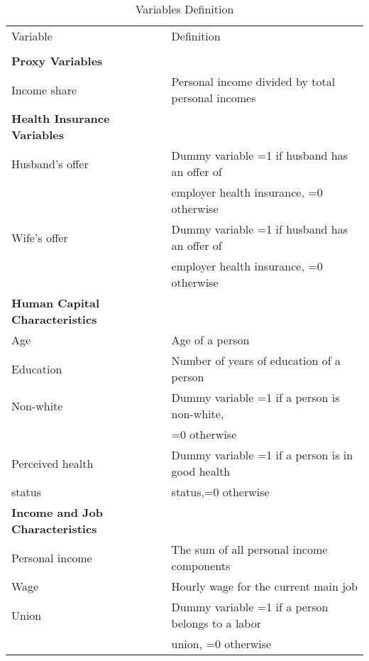 \documentclass[legno,11pt]{article}
\begin{document}
\newpage \extrarowheight=-7pt
\begin{longtable}{@{}l@{\hspace{-8pt}}l}\label{Table_1}\\[-2pt]
\caption{Variables Definition}\\[-2pt]
\toprule
Variable& Definition\\
\hline\\[-6pt]
\textbf{Proxy Variables}\\[-2pt]
\hspace{0.5cm}Income share&Personal income divided by total personal
incomes\\
\textbf{Health Insurance Variables}\\[-2pt]
\hspace{0.5cm}Husband's offer&Dummy variable =1 if husband has an
offer
of \\[-6pt]
\hspace{0.5cm}&employer health insurance, =0 otherwise \\[-2pt]
\hspace{0.5cm}Wife's offer&Dummy variable =1 if husband has an offer
of \\[-6pt]&employer health insurance, =0 otherwise \\[-6pt]
\textbf{Human Capital Characteristics}\\[-2pt]
\hspace{0.5cm}Age&Age of a person\\[-2pt]
\hspace{0.5cm}Education&Number of years of education of a person\\[-2pt]
\hspace{0.5cm}Non-white&Dummy variable =1 if a person is non-white,\\[-6pt]
& =0 otherwise\\[-2pt]
\hspace{0.5cm}Perceived health&Dummy variable =1 if a person is in good health  \\[-6pt]
\hspace{0.5cm}status &status,=0 otherwise\\[-1pt]
\textbf{Income and Job Characteristics}\\[-2pt]
\hspace{0.5cm}Personal income& The sum of all personal income components  \\[-3pt]
\hspace{0.5cm}Wage& Hourly wage for the current main job \\[-3pt]
\hspace{0.5cm}Union&Dummy variable =1 if a person belongs to a labor \\[-5pt] &union, =0 otherwise \\[-3pt]

\end{longtable}
\end{document}
